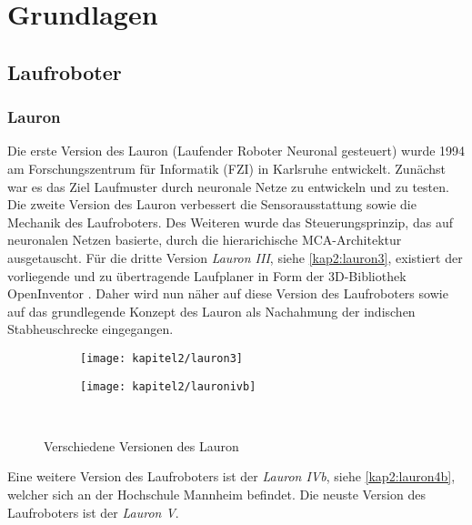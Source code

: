\chapter{Grundlagen}
\label{kap2}

\section{Laufroboter}

\subsection{Lauron}

Die erste Version des Lauron (Laufender Roboter Neuronal gesteuert) wurde 1994 am Forschungszentrum für Informatik (FZI) in Karlsruhe \autocite{fzi} entwickelt. Zunächst war es das Ziel Laufmuster durch neuronale Netze zu entwickeln und zu testen. Die zweite Version des Lauron verbessert die Sensorausstattung sowie die Mechanik des Laufroboters. Des Weiteren wurde das Steuerungsprinzip, das auf neuronalen Netzen basierte, durch die hierarichische MCA-Architektur \autocite{scholl2001modular} ausgetauscht. Für die dritte Version \emph{Lauron III}, siehe \autoref{kap2:lauron3}, existiert der vorliegende und zu übertragende Laufplaner in Form der 3D-Bibliothek OpenInventor \autocite{inventor}. Daher wird nun näher auf diese Version des Laufroboters sowie auf das grundlegende Konzept des Lauron als Nachahmung der indischen Stabheuschrecke eingegangen.

\begin{figure}[b!]
  \centering
  \begin{subfigure}[b]{.4\linewidth}
    \centering
    \texttt{[image: kapitel2/lauron3]}
    \label{kap2:lauron3}
  \end{subfigure}%
  \qquad
  \begin{subfigure}[b]{.4\linewidth}
    \centering
    \texttt{[image: kapitel2/lauronivb]}
    \label{kap2:lauron4b}
  \end{subfigure}\\
  \caption{Verschiedene Versionen des Lauron}
  \label{kap2lauron}
\end{figure}

Eine weitere Version des Laufroboters ist der \emph{Lauron IVb}, siehe \autoref{kap2:lauron4b}, welcher sich an der Hochschule Mannheim befindet. Die neuste Version des Laufroboters ist der \emph{Lauron V}.

